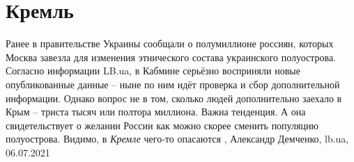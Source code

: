 
 
 
 
 
\chapter{Кремль}
\label{sec:slova.kreml}

Ранее в правительстве Украины сообщали о полумиллионе россиян, которых Москва
завезла для изменения этнического состава украинского полуострова. Согласно
информации LB.ua, в Кабмине серьёзно восприняли новые опубликованные данные –
ныне по ним идёт проверка и сбор дополнительной информации.
Однако вопрос не в том, сколько людей дополнительно заехало в Крым – триста
тысяч или полтора миллиона. Важна тенденция. А она свидетельствует о желании
России как можно скорее сменить популяцию полуострова. Видимо, в \emph{Кремле} чего-то
опасаются
, 
Александр Демченко, lb.ua, 06.07.2021
